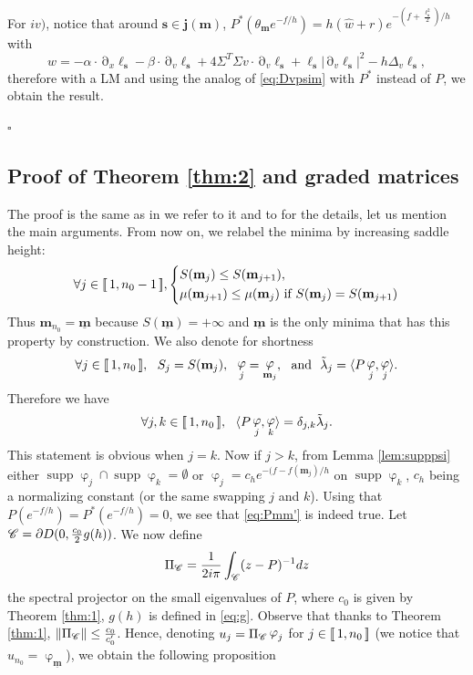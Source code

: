 \documentclass[12pt]{amsart}
\newcommand{\supp}{\operatorname{supp}}
\def\<{\langle}
\def\>{\rangle}
\newcommand{\ep}{\hfill $\square$}
\numberwithin{equation}{section}
\numberwithin{figure}{section}
\def\m{\mathbf{m}}
\def\s{\mathbf{s}}
\def\j{\mathbf{j}}
\def\um{\underline{\m}}
\DeclareMathOperator{\p}{\partial}
\DeclareMathOperator{\phii}{\varphi}
\newcommand{\vvert}[1]{\left\lVert#1\right\rVert}
\newcommand{\lb}{\operatorname{[\negthinspace [}}
\newcommand{\rb}{\operatorname{]\negthinspace ]}}
\begin{document}
For $iv)$, notice that around $\s\in\j(\m)$, $P^*(\theta_\m e^{-f/h}) = h(\hat w + r)e^{-(f+\frac{\ell_\s^{2}}{2})/h}$ with
\begin{equation*}
\hat w = - \alpha\cdot\p_x\ell_\s - \beta\cdot\p_v\ell_\s + 4\Sigma^T\Sigma v\cdot\p_v\ell_\s + \ell_\s|\p_v\ell_\s|^2 - h\Delta_v\ell_\s,
\end{equation*}
therefore with a LM and using the analog of \eqref{eq:Dvpsim} with $P^*$ instead of $P$, we obtain the result.

\ep

\subsection{Proof of Theorem \ref{thm:2} and graded matrices}\label{ssec:proofthm2}
The proof is the same as in \cite{BoLePMi22} we refer to it and to \cite{LePMi20} for the details, let us mention the main arguments. From now on, we relabel the minima by increasing saddle height:
\begin{equation}\label{eq:decreasSmu}
\forall j\in\lb1,n_0-1\rb,\left\{\begin{aligned}
    &S(\m_j) \leq S(\m_{j+1}),\\
    &\mu(\m_{j+1}) \leq \mu(\m_j) \text{ if }S(\m_j) = S(\m_{j+1})
\end{aligned}\right.
\end{equation}
Thus $\m_{n_0} = \um$ because $S(\um) = +\infty$ and $\um$ is the only minima that has this property by construction. We also denote for shortness
\begin{equation*}
\forall j\in\lb1,n_0\rb,\ \ S_j = S(\m_j),\ \ \phii_j = \phii_{\m_j},\ \mbox{ and } \ \tilde{\lambda}_j = \<P\phii_j,\phii_j\>.
\end{equation*}
Therefore we have
\begin{equation}\label{eq:Pmm'}
\forall j,k\in\lb1,n_0\rb,\ \ \<P\phii_j,\phii_k\> = \delta_{j,k}\tilde{\lambda}_j.
\end{equation}
This statement is obvious when $j=k$. Now if $j > k$, from Lemma \ref{lem:supppsi} either $\supp\phii_j\cap\supp\phii_k = \emptyset$ or $\phii_j = c_he^{-(f-f(\m_j)/h}$ on $\supp\phii_k$, $c_h$ being a normalizing constant (or the same swapping $j$ and $k$). Using that $P(e^{-f/h}) = P^*(e^{-f/h}) = 0$, we see that \eqref{eq:Pmm'} is indeed true. Let ${\mathscr C} = \partial D(0,\frac{c_0}2g(h))$. We now define
\begin{equation*}
\Pi_{\mathscr C} = \frac{1}{2i\pi}\int_{{\mathscr C}}(z-P)^{-1}dz
\end{equation*}
the spectral projector on the small eigenvalues of $P$, where $c_0$ is given by Theorem \ref{thm:1}, $g(h)$ is defined in \eqref{eq:g}. Observe that thanks to Theorem \ref{thm:1}, $\vvert{\Pi_\Cr}\leq \frac{c_0}{c_0'}$. Hence, denoting $u_j = \Pi_\Cr\phii_j$ for $j\in\lb1,n_0\rb$ (we notice that $u_{n_0} = \phii_{\um}$), we obtain the following proposition
\end{document}
